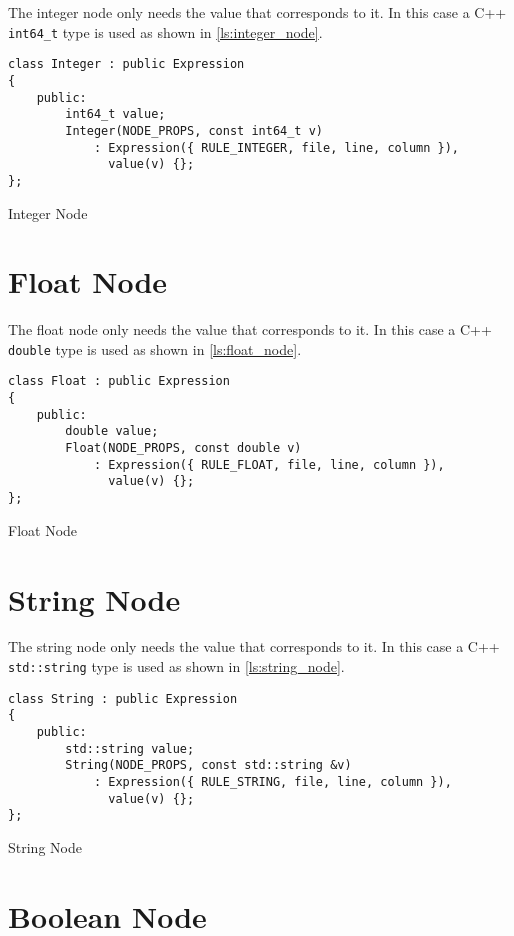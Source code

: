 The integer node only needs the value that corresponds to it. In this case a C++ \texttt{int64\_t} type is used as shown in
\autoref{ls:integer_node}.

\begin{listing}[H]
\begin{verbatim}
class Integer : public Expression
{
    public:
        int64_t value;
        Integer(NODE_PROPS, const int64_t v)
            : Expression({ RULE_INTEGER, file, line, column }),
              value(v) {};
};
\end{verbatim}
\caption{Integer Node}
\label{ls:integer_node}
\end{listing}

\section{Float Node}

The float node only needs the value that corresponds to it. In this case a C++ \texttt{double} type is used as shown in
\autoref{ls:float_node}.

\begin{listing}[H]
\begin{verbatim}
class Float : public Expression
{
    public:
        double value;
        Float(NODE_PROPS, const double v)
            : Expression({ RULE_FLOAT, file, line, column }),
              value(v) {};
};
\end{verbatim}
\caption{Float Node}
\label{ls:float_node}
\end{listing}

\section{String Node}

The string node only needs the value that corresponds to it. In this case a C++ \texttt{std::string} type is used as shown in
\autoref{ls:string_node}.

\begin{listing}[H]
\begin{verbatim}
class String : public Expression
{
    public:
        std::string value;
        String(NODE_PROPS, const std::string &v)
            : Expression({ RULE_STRING, file, line, column }),
              value(v) {};
};
\end{verbatim}
\caption{String Node}
\label{ls:string_node}
\end{listing}

\section{Boolean Node}

